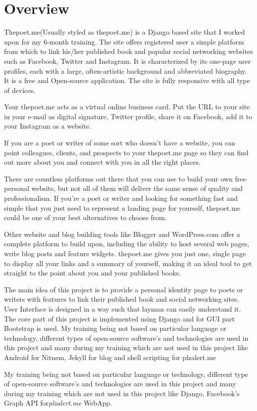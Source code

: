 \section{Overview}

Thepoet.me(Usually styled as thepoet.me)  is a Django based site that I worked upon for my 6-month training. The site offers registered user a simple platform from which to link his/her published book and popular social networking websites such as Facebook, Twitter and Instagram. It is characterized by its one-page user profiles, each with a large, often-artistic background and abbreviated biography. It is a free and Open-source application. The site is fully responsive with all type of devices.

Your thepoet.me acts as a virtual online business card. Put the URL to your site in your e-mail as digital signature, Twitter profile, share it on Facebook, add it to your Instagram as a website.

If you are a poet or writer of some sort who doesn't have a website, you can point colleagues, clients, and prospects to your thepoet.me page so they can find out more about you and connect with you in all the right places.

There are countless platforms out there that you can use to build your own free personal website, but not all of them will deliver the same sense of quality and professionalism. If you’re a poet or writer and looking for something fast and simple that you just need to represent a landing page for yourself, thepoet.me could be one of your best alternatives to choose from.

Other website and blog building tools like Blogger and WordPress.com offer a complete platform to build upon, including the ability to host several web pages, write blog posts and feature widgets. thepoet.me gives you just one, single page to display all your links and a summary of yourself, making it an ideal tool to get straight to the point about you and your published books.

The main idea of this project is to provide a personal identity page to poets or writers with features to link their published book and social networking sites. User Interface is designed in a way such that layman can easily understand it. The core part of this project is implemented using Django and for GUI part Bootstrap is used. My training being not based on particular language or technology, different types of open-source software’s and technologies are used in this project and many during my training which are not used in this project like Android for Nitnem, Jekyll for blog and shell scripting for plzalert.me

My training being not based on particular language or technology, different type of open-source software's and technologies are
used in this project and many during my training which are not used in this
project like Django, Facebook's Graph API for\emph{plzalert.me} WebApp.
